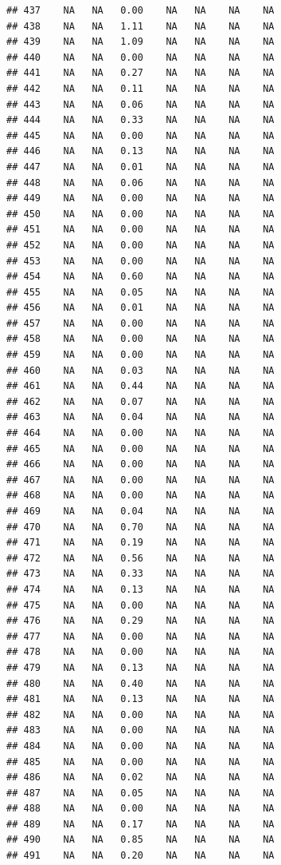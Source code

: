 \documentclass{article}\usepackage{graphicx, color}
\makeatletter
\newenvironment{kframe}{%
 \def\at@end@of@kframe{}%
 \ifinner\ifhmode%
  \def\at@end@of@kframe{\end{minipage}}%
  \begin{minipage}{\columnwidth}%
 \fi\fi%
 \def\FrameCommand##1{\hskip\@totalleftmargin \hskip-\fboxsep
 \colorbox{shadecolor}{##1}\hskip-\fboxsep
     \hskip-\linewidth \hskip-\@totalleftmargin \hskip\columnwidth}%
 \MakeFramed {\advance\hsize-\width
   \@totalleftmargin\z@ \linewidth\hsize
   \@setminipage}}%
 {\par\unskip\endMakeFramed%
 \at@end@of@kframe}
\newenvironment{knitrout}{}{} %
\makeatother
\begin{document}
\begin{knitrout}
\begin{kframe}
\begin{verbatim}
## 437    NA   NA   0.00    NA   NA    NA    NA
## 438    NA   NA   1.11    NA   NA    NA    NA
## 439    NA   NA   1.09    NA   NA    NA    NA
## 440    NA   NA   0.00    NA   NA    NA    NA
## 441    NA   NA   0.27    NA   NA    NA    NA
## 442    NA   NA   0.11    NA   NA    NA    NA
## 443    NA   NA   0.06    NA   NA    NA    NA
## 444    NA   NA   0.33    NA   NA    NA    NA
## 445    NA   NA   0.00    NA   NA    NA    NA
## 446    NA   NA   0.13    NA   NA    NA    NA
## 447    NA   NA   0.01    NA   NA    NA    NA
## 448    NA   NA   0.06    NA   NA    NA    NA
## 449    NA   NA   0.00    NA   NA    NA    NA
## 450    NA   NA   0.00    NA   NA    NA    NA
## 451    NA   NA   0.00    NA   NA    NA    NA
## 452    NA   NA   0.00    NA   NA    NA    NA
## 453    NA   NA   0.00    NA   NA    NA    NA
## 454    NA   NA   0.60    NA   NA    NA    NA
## 455    NA   NA   0.05    NA   NA    NA    NA
## 456    NA   NA   0.01    NA   NA    NA    NA
## 457    NA   NA   0.00    NA   NA    NA    NA
## 458    NA   NA   0.00    NA   NA    NA    NA
## 459    NA   NA   0.00    NA   NA    NA    NA
## 460    NA   NA   0.03    NA   NA    NA    NA
## 461    NA   NA   0.44    NA   NA    NA    NA
## 462    NA   NA   0.07    NA   NA    NA    NA
## 463    NA   NA   0.04    NA   NA    NA    NA
## 464    NA   NA   0.00    NA   NA    NA    NA
## 465    NA   NA   0.00    NA   NA    NA    NA
## 466    NA   NA   0.00    NA   NA    NA    NA
## 467    NA   NA   0.00    NA   NA    NA    NA
## 468    NA   NA   0.00    NA   NA    NA    NA
## 469    NA   NA   0.04    NA   NA    NA    NA
## 470    NA   NA   0.70    NA   NA    NA    NA
## 471    NA   NA   0.19    NA   NA    NA    NA
## 472    NA   NA   0.56    NA   NA    NA    NA
## 473    NA   NA   0.33    NA   NA    NA    NA
## 474    NA   NA   0.13    NA   NA    NA    NA
## 475    NA   NA   0.00    NA   NA    NA    NA
## 476    NA   NA   0.29    NA   NA    NA    NA
## 477    NA   NA   0.00    NA   NA    NA    NA
## 478    NA   NA   0.00    NA   NA    NA    NA
## 479    NA   NA   0.13    NA   NA    NA    NA
## 480    NA   NA   0.40    NA   NA    NA    NA
## 481    NA   NA   0.13    NA   NA    NA    NA
## 482    NA   NA   0.00    NA   NA    NA    NA
## 483    NA   NA   0.00    NA   NA    NA    NA
## 484    NA   NA   0.00    NA   NA    NA    NA
## 485    NA   NA   0.00    NA   NA    NA    NA
## 486    NA   NA   0.02    NA   NA    NA    NA
## 487    NA   NA   0.05    NA   NA    NA    NA
## 488    NA   NA   0.00    NA   NA    NA    NA
## 489    NA   NA   0.17    NA   NA    NA    NA
## 490    NA   NA   0.85    NA   NA    NA    NA
## 491    NA   NA   0.20    NA   NA    NA    NA

\end{verbatim}
\end{kframe}
\end{knitrout}
\end{document}

